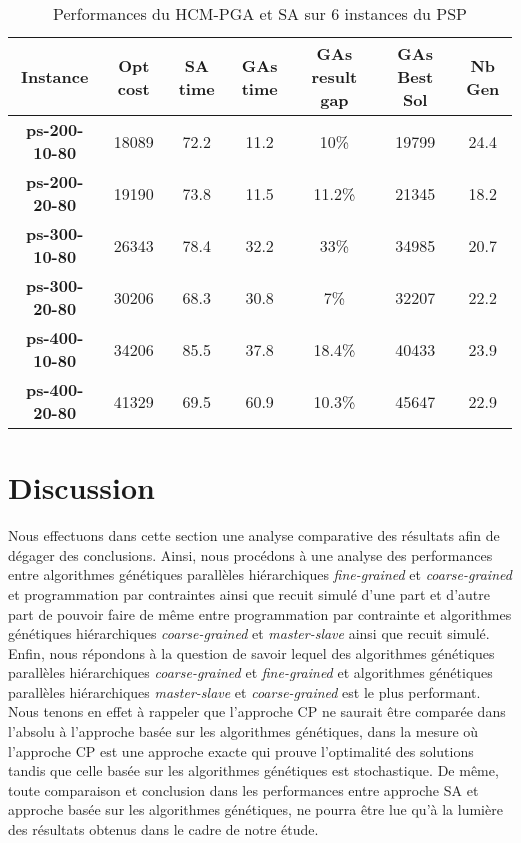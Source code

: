 	\begin{table}[h]
		\centering
		\begin{tabular}{|c|c|c|c|c|c|c|}
			\hline
			\textbf{Instance} & \textbf{Opt cost} & \textbf{SA time} & \textbf{GAs time} & \textbf{GAs result gap} & \textbf{GAs Best Sol} & \textbf{Nb Gen}\\
			\hline
			\textbf{ps-200-10-80} & 18089 & 72.2 & 11.2 & 10\% & 19799 & 24.4 \\
			\textbf{ps-200-20-80} & 19190 & 73.8 & 11.5 & 11.2\% & 21345 & 18.2 \\
			\textbf{ps-300-10-80} & 26343 & 78.4 & 32.2 & 33\% & 34985 & 20.7 \\
			\textbf{ps-300-20-80} & 30206 & 68.3 & 30.8 & 7\% & 32207 & 22.2 \\
			\textbf{ps-400-10-80} & 34206 & 85.5 & 37.8 & 18.4\% & 40433 & 23.9 \\
			\textbf{ps-400-20-80} & 41329 & 69.5 & 60.9 & 10.3\% & 45647 & 22.9 \\
			\hline
		\end{tabular}	
		\caption{Performances du HCM-PGA et SA sur 6 instances du PSP}	
		\label{tab:hcm_pga_sa}	
	\end{table}					
	
		\section{Discussion}
		Nous effectuons dans cette section une analyse comparative des résultats afin de dégager des conclusions. Ainsi, nous procédons à une analyse des performances entre algorithmes génétiques parallèles hiérarchiques \emph{fine-grained} et \emph{coarse-grained} et programmation par contraintes ainsi que recuit simulé d'une part et d'autre part de pouvoir faire de même entre programmation par contrainte et algorithmes génétiques hiérarchiques \emph{coarse-grained} et \emph{master-slave} ainsi que recuit simulé. Enfin, nous répondons à la question de savoir lequel des algorithmes génétiques parallèles hiérarchiques \emph{coarse-grained} et \emph{fine-grained} et algorithmes génétiques parallèles hiérarchiques \emph{master-slave} et \emph{coarse-grained} est le plus performant. Nous tenons en effet à rappeler que l'approche CP ne saurait être comparée dans l'absolu à l'approche basée sur les algorithmes génétiques, dans la mesure où l'approche CP est une approche exacte qui prouve l'optimalité des solutions tandis que celle basée sur les algorithmes génétiques est stochastique. De même, toute comparaison et conclusion dans les performances entre approche SA et approche basée sur les algorithmes génétiques, ne pourra être lue qu'à la lumière des résultats obtenus dans le cadre de notre étude.
		

